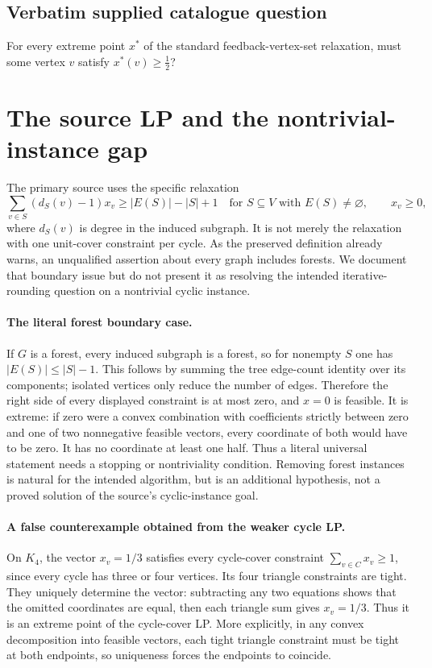 \documentclass[11pt]{article}
\begin{document}
\subsection{Verbatim supplied catalogue question}
For every extreme point $x^*$ of the standard feedback-vertex-set relaxation, must some vertex $v$ satisfy $x^*(v)\geq\tfrac12$?

\section{The source LP and the nontrivial-instance gap}
The primary source uses the specific relaxation
\[
\sum_{v\in S}(d_S(v)-1)x_v\ge|E(S)|-|S|+1
\quad\text{for }S\subseteq V\text{ with }E(S)\ne\varnothing,
\qquad x_v\ge0,
\]
where $d_S(v)$ is degree in the induced subgraph. It is
not merely the relaxation with one unit-cover constraint per cycle.
As the preserved definition already warns, an unqualified assertion
about every graph includes forests. We document that boundary issue
but do not present it as resolving the intended iterative-rounding
question on a nontrivial cyclic instance.

\paragraph{The literal forest boundary case.}
If $G$ is a forest, every induced subgraph is a forest,
so for nonempty $S$ one has $|E(S)|\le|S|-1$.
This follows by summing the tree edge-count identity over its
components; isolated vertices only reduce the number of edges.
Therefore the right side of every displayed constraint is at most
zero, and $x=0$ is feasible. It is extreme: if zero were
a convex combination with coefficients strictly between zero and
one of two nonnegative feasible vectors, every coordinate of both
would have to be zero. It has no coordinate at least one half.
Thus a literal universal statement needs a stopping or nontriviality
condition. Removing forest instances is natural for the intended
algorithm, but is an additional hypothesis, not a proved solution
of the source's cyclic-instance goal.

\paragraph{A false counterexample obtained from the weaker cycle LP.}
On $K_4$, the vector $x_v=1/3$ satisfies every cycle-cover
constraint $\sum_{v\in C}x_v\ge1$, since every cycle
has three or four vertices. Its four triangle constraints are tight.
They uniquely determine the vector: subtracting any two equations
shows that the omitted coordinates are equal, then each triangle
sum gives $x_v=1/3$. Thus it is an extreme point of the
cycle-cover LP. More explicitly, in any convex decomposition into
feasible vectors, each tight triangle constraint must be tight at
both endpoints, so uniqueness forces the endpoints to coincide.
\end{document}
